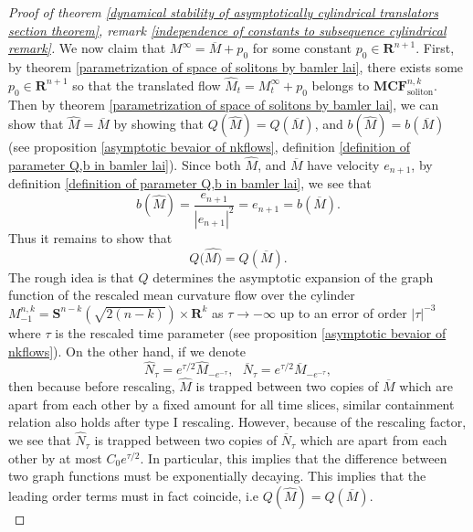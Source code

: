 \documentclass[pdflatex,sn-mathphys-num]{sn-jnl}%
\begin{document}
\begin{proof}[Proof of theorem \ref{dynamical stability of asymptotically cylindrical translators section theorem}, remark \ref{independence of constants to subsequence cylindrical remark}]
We now claim that $M^{\infty} = \overline{M} + p_0$ for some constant $p_0 \in \mathbf{R}^{n+1}$. First, by theorem \ref{parametrization of space of solitons by bamler lai}, there exists some $p_0 \in \mathbf{R}^{n+1}$ so that the translated flow $\hat{M}_t = M^{\infty}_t + p_0$ belongs to $\textbf{MCF}^{n,k}_{\text{soliton}}$. Then by theorem \ref{parametrization of space of solitons by bamler lai}, we can show that $\hat{M} = \overline{M}$ by showing that $Q(\hat{M}) = Q(\overline{M})$, and $b(\hat{M}) = b(\overline{M})$ (see proposition \ref{asymptotic bevaior of nkflows}, definition \ref{definition of parameter Q,b in bamler lai}). Since both $\hat{M}$, and $\overline{M}$ have velocity $e_{n+1}$, by definition \ref{definition of parameter Q,b in bamler lai}, we see that
\begin{equation}
    b(\hat{M}) = \frac{e_{n+1}}{|e_{n+1}|^2} = e_{n+1} = b(\overline{M}).
\end{equation}
Thus it remains to show that 
\begin{equation}
    Q(\hat{M)} = Q(\overline{M}).
\end{equation}
The rough idea is that $Q$ determines the asymptotic expansion of the graph function of the rescaled mean curvature flow over the cylinder $M^{n,k}_{-1} = \mathbf{S}^{n-k}(\sqrt{2(n-k)})\times \mathbf{R}^k$ as $\tau \to -\infty $ up to an error of order $|\tau|^{-3}$ where $\tau$ is the rescaled time parameter (see proposition \ref{asymptotic bevaior of nkflows}). On the other hand, if we denote
\begin{equation}
    \hat{N}_{\tau} = e^{\tau/2}\hat{M}_{-e^{-\tau}}, \ \ \ \overline{N}_{\tau} = e^{\tau/2}\overline{M}_{-e^{-\tau}},
\end{equation}
then because before rescaling, $\hat{M}$ is trapped between two copies of $\overline{M}$ which are apart from each other by a fixed amount for all time slices, similar containment relation also holds after type I rescaling. However, because of the rescaling factor, we see that $\hat{N}_{\tau}$ is trapped between two copies of $\overline{N}_{\tau}$ which are apart from each other by at most $C_0e^{\tau/2}$. In particular, this implies that the difference between two graph functions must be exponentially decaying. This implies that the leading order terms must in fact coincide, i.e $Q(\hat{M}) = Q(\overline{M})$.\\


\end{proof}
\end{document}
